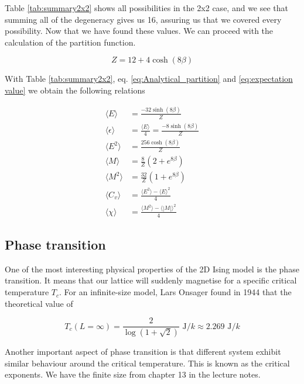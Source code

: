\documentclass[english,notitlepage,reprint,nofootinbib]{revtex4-2}  %
\begin{document}
	Table \ref{tab:summary2x2} shows all possibilities in the 2x2 case, and we see that summing all
	of the degeneracy gives us 16, assuring us that we covered every possibility. Now that
	we have found these values. We can proceed with the calculation of the partition function.

	\begin{equation}
		Z = 12 + 4\cosh(8\beta) \label{eq:Analytical_partition}
	\end{equation}


	With Table \ref{tab:summary2x2}, eq. \ref{eq:Analytical_partition} and \ref{eq:expectation value} we obtain the following relations

	\begin{align*} \label{eq:sol}
		\langle E \rangle &= \frac{-32\sinh(8\beta)}{Z}  \\
		\langle \epsilon \rangle &= \frac{\langle E \rangle}{4} = \frac{-8\sinh(8\beta)}{Z} \\
		\langle E^2 \rangle &= \frac{256 \cosh(8\beta)}{Z} \\
		\langle M \rangle &= \frac{8}{Z} (2 + e^{8\beta}) \\
		\langle M^2 \rangle &= \frac{32}{Z} (1 + e^{8\beta}) \\
		\langle C_v \rangle &= \frac{\langle E^2 \rangle - \langle E \rangle^2}{4} \\
		\langle \chi \rangle &=  \frac{\langle M^2 \rangle - \langle |M| \rangle^2}{4}
	\end{align*}


	\subsection{Phase transition}\label{subsec:phase transition}
	One of the most interesting physical properties of the 2D Ising model is the phase transition.
	It means that our lattice will suddenly magnetise for a specific critical temperature $T_c$. For an infinite-size model, Lars Onsager found in 1944 that the theoretical value of

	\begin{equation}
		T_c(L=\infty)=\frac{2}{\log(1 + \sqrt{2})} \text{ J}/k \approx 2.269 \text{ J}/k \label{Tc_theo}
	\end{equation}

	Another important aspect of phase transition is that different system exhibit similar
	behaviour around the critical temperature. This is known as the critical exponents. We have the finite size from chapter 13 in the lecture notes\cite{Morten15}.
\end{document}
